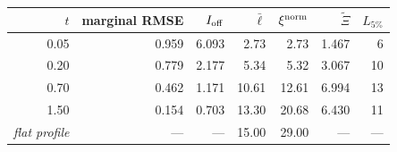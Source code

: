 \begin{tabular}{@{}rrrrrrr@{}}
\toprule
$t$ & marginal RMSE & $I_{\rm off}$ & $\bar\ell$ & $\xi^{\rm norm}$ & $\widetilde\Xi$ & $L_{5\%}$ \\
\midrule
0.05 & 0.959 & 6.093 & 2.73 & 2.73 & 1.467 & 6 \\
0.20 & 0.779 & 2.177 & 5.34 & 5.32 & 3.067 & 10 \\
0.70 & 0.462 & 1.171 & 10.61 & 12.61 & 6.994 & 13 \\
1.50 & 0.154 & 0.703 & 13.30 & 20.68 & 6.430 & 11 \\
\midrule
\emph{flat profile} & --- & --- & 15.00 & 29.00 & --- & --- \\
\bottomrule
\end{tabular}
